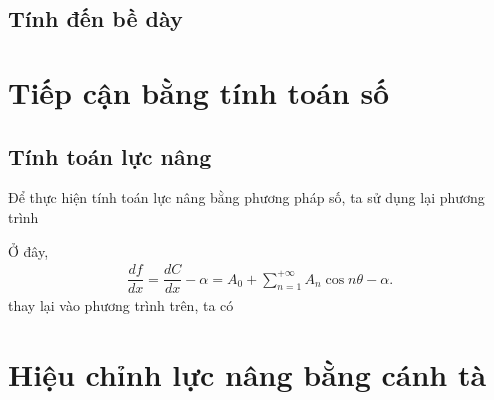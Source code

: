 \documentclass[KHI_DONG_HOC.tex]{subfiles}
\begin{document}
	\subsection{Tính đến bề dày}
	
\section{Tiếp cận bằng tính toán số}
	\subsection{Tính toán lực nâng}

	Để thực hiện tính toán lực nâng bằng phương pháp số, ta sử dụng lại phương trình 

	Ở đây, 
	\begin{align}
		\dfrac{df}{dx}=\dfrac{dC}{dx}-\alpha={A_0} + \sum\limits_{n = 1}^{ + \infty } {{A_n}\cos n\theta }-\alpha.
	\end{align}
	thay lại vào phương trình trên, ta có






\section{Hiệu chỉnh lực nâng bằng cánh tà}
\end{document}
